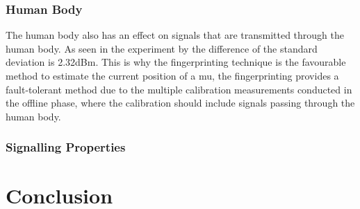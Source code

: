 \subsubsection{Human Body}
The human body also has an effect on signals that are transmitted through the human body. As seen in the experiment by \cite{S2016} the difference of the standard deviation is 2.32dBm. This is why the fingerprinting technique is the favourable method to estimate the current position of a \acrlong{mu}, the fingerprinting provides a fault-tolerant method due to the multiple calibration measurements conducted in the offline phase, where the calibration should include signals passing through the human body.
\subsubsection{Signalling Properties}

\section{Conclusion}
